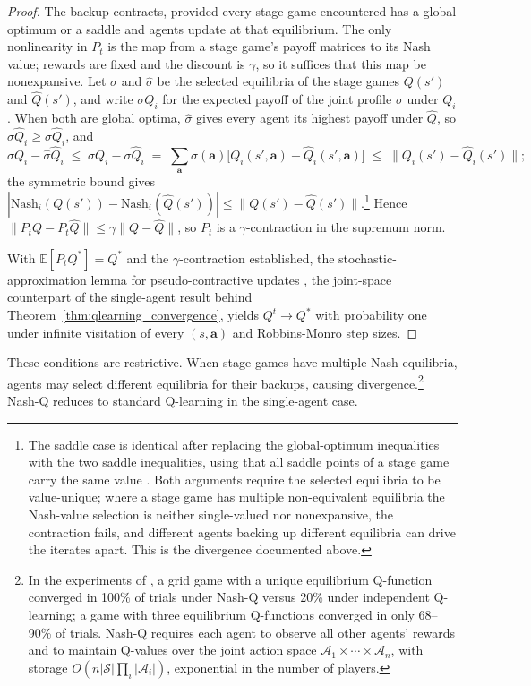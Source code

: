 \begin{proof}
The backup contracts, provided every stage game encountered has a global optimum or a saddle and agents update at that equilibrium. The only nonlinearity in $P_t$ is the map from a stage game's payoff matrices to its Nash value; rewards are fixed and the discount is $\gamma$, so it suffices that this map be nonexpansive. Let $\sigma$ and $\hat{\sigma}$ be the selected equilibria of the stage games $Q(s')$ and $\hat{Q}(s')$, and write $\sigma Q_i$ for the expected payoff of the joint profile $\sigma$ under $Q_i$. When both are global optima, $\hat{\sigma}$ gives every agent its highest payoff under $\hat{Q}$, so $\hat{\sigma} \hat{Q}_i \geq \sigma \hat{Q}_i$, and
\[
\sigma Q_i - \hat{\sigma} \hat{Q}_i \;\leq\; \sigma Q_i - \sigma \hat{Q}_i \;=\; \sum_{\mathbf{a}} \sigma(\mathbf{a})\bigl[Q_i(s',\mathbf{a}) - \hat{Q}_i(s',\mathbf{a})\bigr] \;\leq\; \|Q_i(s') - \hat{Q}_i(s')\|;
\]
the symmetric bound gives $|\mathrm{Nash}_i(Q(s')) - \mathrm{Nash}_i(\hat{Q}(s'))| \leq \|Q(s') - \hat{Q}(s')\|$.\footnote{The saddle case is identical after replacing the global-optimum inequalities with the two saddle inequalities, using that all saddle points of a stage game carry the same value \citep[Lemma~14]{hu2003nash}. Both arguments require the selected equilibria to be value-unique; where a stage game has multiple non-equivalent equilibria the Nash-value selection is neither single-valued nor nonexpansive, the contraction fails, and different agents backing up different equilibria can drive the iterates apart. This is the divergence documented above.} Hence $\|P_t Q - P_t \hat{Q}\| \leq \gamma \|Q - \hat{Q}\|$, so $P_t$ is a $\gamma$-contraction in the supremum norm.

With $\mathbb{E}[P_t Q^*] = Q^*$ and the $\gamma$-contraction established, the stochastic-approximation lemma for pseudo-contractive updates \citep[Lemma~8]{hu2003nash}, the joint-space counterpart of the single-agent result behind Theorem~\ref{thm:qlearning_convergence}, yields $Q^t \to Q^*$ with probability one under infinite visitation of every $(s,\mathbf{a})$ and Robbins-Monro step sizes.
\end{proof}

These conditions are restrictive. When stage games have multiple Nash equilibria, agents may select different equilibria for their backups, causing divergence.\footnote{In the experiments of \citet{hu2003nash}, a grid game with a unique equilibrium Q-function converged in 100\% of trials under Nash-Q versus 20\% under independent Q-learning; a game with three equilibrium Q-functions converged in only 68--90\% of trials. Nash-Q requires each agent to observe all other agents' rewards and to maintain Q-values over the joint action space $\mathcal{A}_1 \times \cdots \times \mathcal{A}_n$, with storage $O(n |\mathcal{S}| \prod_i |\mathcal{A}_i|)$, exponential in the number of players.} Nash-Q reduces to standard Q-learning in the single-agent case.

